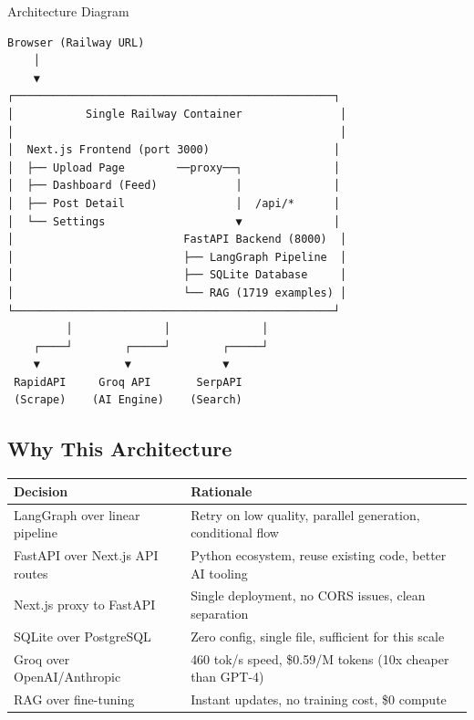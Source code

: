 \documentclass[12pt,a4paper]{article}
\begin{document}
\begin{archbox}{Architecture Diagram}
\begin{verbatim}
Browser (Railway URL)
    │
    ▼
┌─────────────────────────────────────────────────┐
│           Single Railway Container               │
│                                                  │
│  Next.js Frontend (port 3000)                   │
│  ├── Upload Page        ──proxy──┐              │
│  ├── Dashboard (Feed)            │              │
│  ├── Post Detail                 │  /api/*      │
│  └── Settings                    ▼              │
│                          FastAPI Backend (8000)  │
│                          ├── LangGraph Pipeline  │
│                          ├── SQLite Database     │
│                          └── RAG (1719 examples) │
└─────────────────────────────────────────────────┘
         │              │              │
    ┌────┘        ┌─────┘        ┌─────┘
    ▼             ▼              ▼
 RapidAPI     Groq API       SerpAPI
 (Scrape)    (AI Engine)    (Search)
\end{verbatim}
\end{archbox}

\subsection{Why This Architecture}

\begin{center}
\begin{tabularx}{\textwidth}{lX}
\toprule
\textbf{Decision} & \textbf{Rationale} \\
\midrule
LangGraph over linear pipeline & Retry on low quality, parallel generation, conditional flow \\
FastAPI over Next.js API routes & Python ecosystem, reuse existing code, better AI tooling \\
Next.js proxy to FastAPI & Single deployment, no CORS issues, clean separation \\
SQLite over PostgreSQL & Zero config, single file, sufficient for this scale \\
Groq over OpenAI/Anthropic & 460 tok/s speed, \$0.59/M tokens (10x cheaper than GPT-4) \\
RAG over fine-tuning & Instant updates, no training cost, \$0 compute \\
\bottomrule
\end{tabularx}
\end{center}

\end{document}
